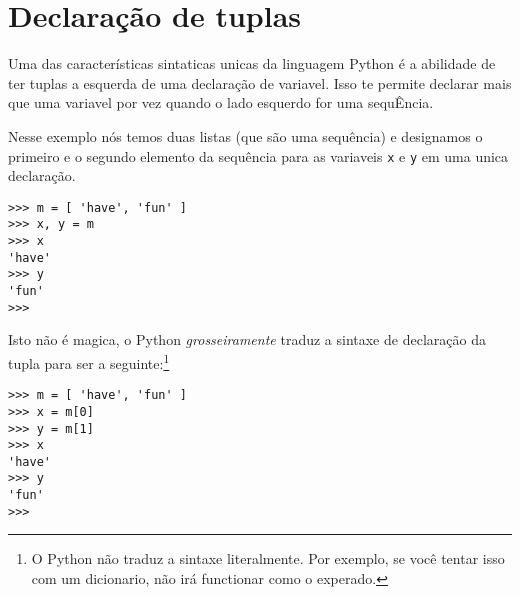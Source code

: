 \section{Declaração de tuplas}
\label{tuple assignment}


Uma das características sintaticas unicas da linguagem Python é
a abilidade de ter tuplas a esquerda de uma declaração de variavel.
Isso te permite declarar mais que uma variavel por vez quando o
lado esquerdo for uma sequÊncia.

Nesse exemplo nós temos duas listas (que são uma sequência) e
designamos o primeiro e o segundo elemento da sequência para as
variaveis {\tt x} e {\tt y} em uma unica declaração.

\beforeverb
\begin{verbatim}
>>> m = [ 'have', 'fun' ]
>>> x, y = m
>>> x
'have'
>>> y
'fun'
>>> 
\end{verbatim}
\afterverb
%
Isto não é magica, o Python \emph{grosseiramente} traduz a
sintaxe de declaração da tupla
para ser a seguinte:\footnote{O Python não traduz a sintaxe
literalmente. Por exemplo, se você tentar isso com um dicionario, não
irá functionar como o experado.}

\beforeverb
\begin{verbatim}
>>> m = [ 'have', 'fun' ]
>>> x = m[0]
>>> y = m[1]
>>> x
'have'
>>> y
'fun'
>>> 
\end{verbatim}
\afterverb

